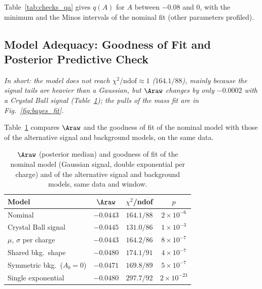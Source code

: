 Table~\ref{tab:checks_qa} gives $q(A)$ for $A$ between $-0.08$ and $0$, with the minimum and the Minos intervals of the nominal fit (other parameters profiled).

\begin{table}[!t]
\centering
{}
\caption{Profile likelihood ratio $q(A)=-2\Delta\ln L$ of the nominal fit (other parameters profiled); minimum at $-0.0441$, Minos intervals $[-0.0526,-0.0356]$ ($68\%$) and $[-0.0607,-0.0275]$ ($95\%$).}
\label{tab:checks_qa}
\end{table}

\subsection{Model Adequacy: Goodness of Fit and Posterior Predictive Check}
\label{sec:bayes_gof}
\emph{In short: the model does not reach $\chi^2/\mathrm{ndof}\approx1$ ($164.1/88$), mainly because the signal tails are heavier than a Gaussian, but $\Araw$ changes by only $-0.0002$ with a Crystal Ball signal (Table~\ref{tab:gof}); the pulls of the mass fit are in Fig.~\ref{fig:bayes_fit}.}

Table~\ref{tab:gof} compares $\Araw$ and the goodness of fit of the nominal model with those of the alternative signal and background models, on the same data.

\begin{table}[!t]
\centering
\begin{tabular}{lccc}
\toprule
Model & $\Araw$ & $\chi^2$/ndof & $p$ \\
\midrule
Nominal & $-0.0443$ & $164.1/88$ & $2\times10^{-6}$ \\
Crystal Ball signal & $-0.0445$ & $131.0/86$ & $1\times10^{-3}$ \\
$\mu$, $\sigma$ per charge & $-0.0443$ & $164.2/86$ & $8\times10^{-7}$ \\
Shared bkg.\ shape & $-0.0480$ & $174.1/91$ & $4\times10^{-7}$ \\
Symmetric bkg.\ ($A_b=0$) & $-0.0471$ & $169.8/89$ & $5\times10^{-7}$ \\
Single exponential & $-0.0480$ & $297.7/92$ & $2\times10^{-23}$ \\
\bottomrule
\end{tabular}
\caption{$\Araw$ (posterior median) and goodness of fit of the nominal model (Gaussian signal, double exponential per charge) and of the alternative signal and background models, same data and window.}
\label{tab:gof}
\end{table}

